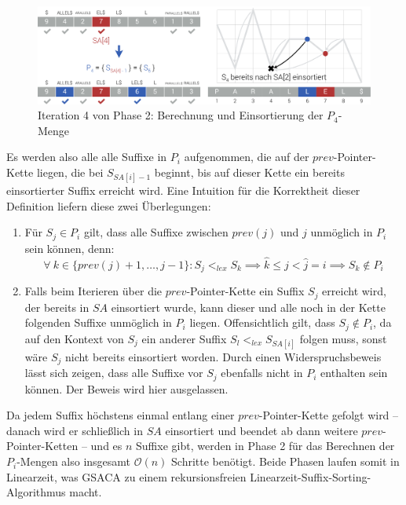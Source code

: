 \documentclass[twoside,11pt]{article}
\theoremstyle{break}
\begin{document}
\hline
\begin{figure}[h]
	\centering
	\includegraphics[width=\linewidth,bb=0 0 1310 386]{./assets/phase2-4.pdf}
	\caption{Iteration 4 von Phase 2: Berechnung und Einsortierung der $P_4$-Menge}
\label{fig:phase2-4}
\end{figure}

Es werden also alle alle Suffixe in $P_i$ aufgenommen, die auf der $prev$-Pointer-Kette liegen, die bei $S_{SA[i] - 1}$ beginnt, bis auf dieser Kette ein bereits einsortierter Suffix erreicht wird. Eine Intuition für die Korrektheit dieser Definition liefern diese zwei Überlegungen:

\begin{enumerate}
	\item Für $S_j \in P_i$ gilt, dass alle Suffixe zwischen $prev(j)$ und $j$ unmöglich in $P_i$ sein können, denn: $$\forall\ k \in \{ prev(j) + 1, \dots, j - 1 \}: S_j <_{lex} S_k \implies \widehat{k} \le j < \widehat{j} = i \implies S_k \notin P_i$$
	\item Falls beim Iterieren über die $prev$-Pointer-Kette ein Suffix $S_j$ erreicht wird, der bereits in $SA$ einsortiert wurde, kann dieser und alle noch in der Kette folgenden Suffixe unmöglich in $P_i$ liegen. Offensichtlich gilt, dass $S_j \notin P_i$, da auf den Kontext von $S_j$ ein anderer Suffix $S_l <_{lex} S_{SA[i]}$ folgen muss, sonst wäre $S_j$ nicht bereits einsortiert worden. Durch einen Widerspruchsbeweis lässt sich zeigen, dass alle Suffixe vor $S_j$ ebenfalls nicht in $P_i$ enthalten sein können. Der Beweis wird hier ausgelassen.
\end{enumerate}

Da jedem Suffix höchstens einmal entlang einer $prev$-Pointer-Kette gefolgt wird – danach wird er schließlich in $SA$ einsortiert und beendet ab dann weitere $prev$-Pointer-Ketten – und es $n$ Suffixe gibt, werden in Phase 2 für das Berechnen der $P_i$-Mengen also insgesamt $\mathcal{O}(n)$ Schritte benötigt. Beide Phasen laufen somit in Linearzeit, was GSACA zu einem rekursionsfreien Linearzeit-Suffix-Sorting-Algorithmus macht.
\end{document}
